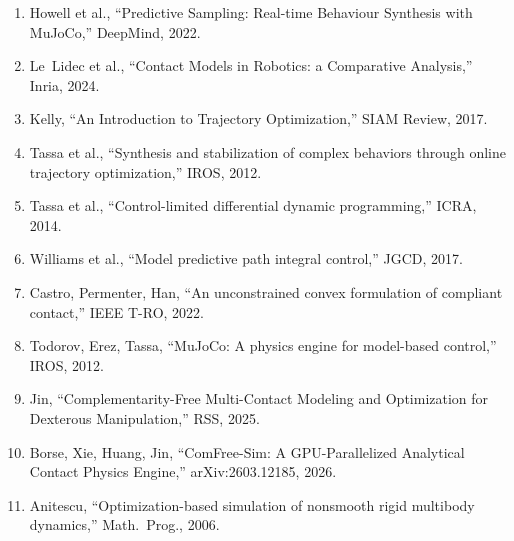 \documentclass[11pt,twoside]{report}
\theoremstyle{definition}
\theoremstyle{plain}
\theoremstyle{remark}
\newcommand{\0}{\bm{0}}
\begin{document}
\begin{enumerate}
\item Howell et al., ``Predictive Sampling: Real-time Behaviour Synthesis with MuJoCo,'' DeepMind, 2022.
\item Le~Lidec et al., ``Contact Models in Robotics: a Comparative Analysis,'' Inria, 2024.
\item Kelly, ``An Introduction to Trajectory Optimization,'' SIAM Review, 2017.
\item Tassa et al., ``Synthesis and stabilization of complex behaviors through online trajectory optimization,'' IROS, 2012.
\item Tassa et al., ``Control-limited differential dynamic programming,'' ICRA, 2014.
\item Williams et al., ``Model predictive path integral control,'' JGCD, 2017.
\item Castro, Permenter, Han, ``An unconstrained convex formulation of compliant contact,'' IEEE T-RO, 2022.
\item Todorov, Erez, Tassa, ``MuJoCo: A physics engine for model-based control,'' IROS, 2012.
\item Jin, ``Complementarity-Free Multi-Contact Modeling and Optimization for Dexterous Manipulation,'' RSS, 2025.
\item Borse, Xie, Huang, Jin, ``ComFree-Sim: A GPU-Parallelized Analytical Contact Physics Engine,'' arXiv:2603.12185, 2026.
\item Anitescu, ``Optimization-based simulation of nonsmooth rigid multibody dynamics,'' Math.\ Prog., 2006.
\end{enumerate}
\end{document}
